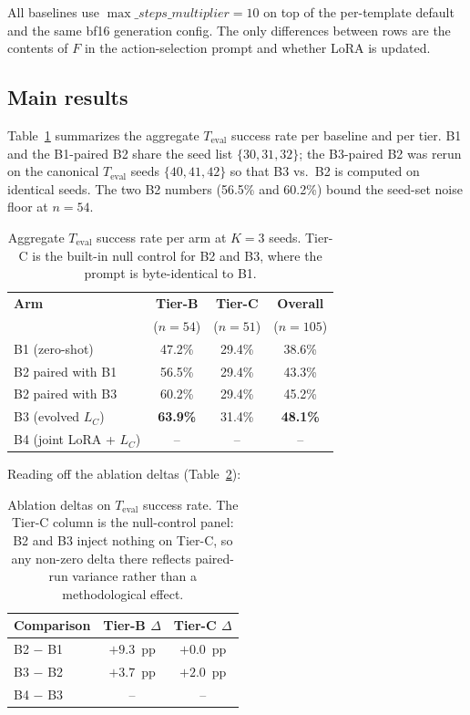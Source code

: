 All baselines use $\max\_steps\_multiplier = 10$ on top of the per-template default and the same bf16 generation config. The only differences between rows are the contents of $F$ in the action-selection prompt and whether LoRA is updated.

\subsection{Main results}
\label{sec:eval-main}

Table~\ref{tab:main} summarizes the aggregate $T_{\text{eval}}$ success rate per baseline and per tier. B1 and the B1-paired B2 share the seed list $\{30, 31, 32\}$; the B3-paired B2 was rerun on the canonical $T_{\text{eval}}$ seeds $\{40, 41, 42\}$ so that B3 vs.\ B2 is computed on identical seeds. The two B2 numbers (56.5\% and 60.2\%) bound the seed-set noise floor at $n{=}54$.

\begin{table}[t]
\small
\centering
\begin{tabular}{lccc}
\hline
\textbf{Arm} & \textbf{Tier-B} & \textbf{Tier-C} & \textbf{Overall} \\
             & ($n{=}54$) & ($n{=}51$) & ($n{=}105$) \\
\hline
B1 (zero-shot)              & 47.2\%  & 29.4\%  & 38.6\%  \\
B2 paired with B1           & 56.5\%  & 29.4\%  & 43.3\%  \\
B2 paired with B3           & 60.2\%  & 29.4\%  & 45.2\%  \\
B3 (evolved $L_C$)          & \textbf{63.9\%}  & 31.4\%  & \textbf{48.1\%}  \\
B4 (joint LoRA + $L_C$)     & --      & --      & --      \\
\hline
\end{tabular}
\caption{Aggregate $T_{\text{eval}}$ success rate per arm at $K{=}3$ seeds. Tier-C is the built-in null control for B2 and B3, where the prompt is byte-identical to B1.}
\label{tab:main}
\end{table}

Reading off the ablation deltas (Table~\ref{tab:deltas}):

\begin{table}[t]
\small
\centering
\begin{tabular}{lcc}
\hline
\textbf{Comparison} & \textbf{Tier-B $\Delta$} & \textbf{Tier-C $\Delta$} \\
\hline
B2 $-$ B1   & $+9.3$~pp & $+0.0$~pp \\
B3 $-$ B2   & $+3.7$~pp & $+2.0$~pp \\
B4 $-$ B3   & --        & --        \\
\hline
\end{tabular}
\caption{Ablation deltas on $T_{\text{eval}}$ success rate. The Tier-C column is the null-control panel: B2 and B3 inject nothing on Tier-C, so any non-zero delta there reflects paired-run variance rather than a methodological effect.}
\label{tab:deltas}
\end{table}

